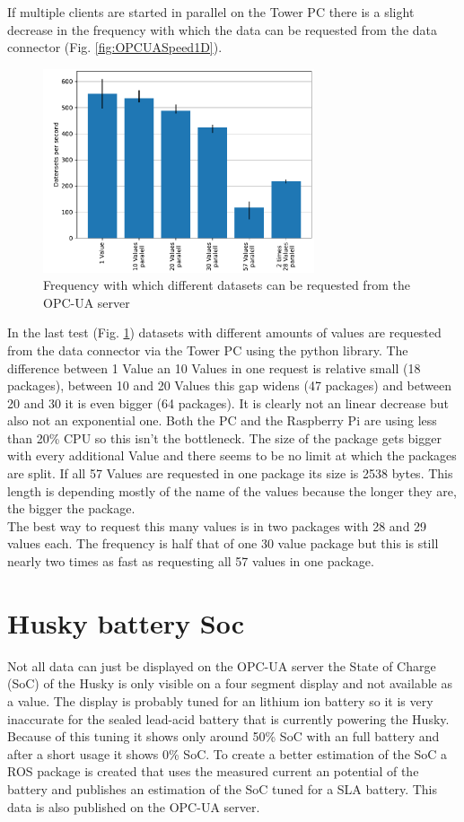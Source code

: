 \documentclass[conference]{IEEEtran}
\begin{document}
If multiple clients are started in parallel on the Tower PC there is a slight decrease in the frequency with which the data can be requested from the data connector (Fig. \ref{fig:OPCUASpeed1D}).\\
\begin{figure}[htbp]
    \centerline{\includegraphics[width=8cm]{Pictures/OPCUAMultipleDatenAufEinmal.pdf}}
    \caption{Frequency with which different datasets can be requested from the OPC-UA server}
    \label{fig:OPCUAMultipleDatenAufEinmal}
\end{figure}
In the last test (Fig. \ref{fig:OPCUAMultipleDatenAufEinmal}) datasets with different amounts of values are requested from the data connector via the Tower PC using the python library.
The difference between 1 Value an 10 Values in one request is relative small (18 packages), between 10 and 20 Values this gap widens (47 packages) and between 20 and 30 it is even bigger (64 packages).
It is clearly not an linear decrease but also not an exponential one. 
Both the PC and the Raspberry Pi are using less than 20\% CPU so this isn't the bottleneck.
The size of the package gets bigger with every additional Value and there seems to be no limit at which the packages are split.
If all 57 Values are requested in one package its size is 2538 bytes.
This length is depending mostly of the name of the values because the longer they are, the bigger the package.\\
The best way to request this many values is in two packages with 28 and 29 values each.
The frequency is half that of one 30 value package but this is still nearly two times as fast as requesting all 57 values in one package.
\section{Husky battery Soc}
Not all data can just be displayed on the OPC-UA server the State of Charge (SoC) of the Husky is only visible on a four segment display and not available as a value.
The display is probably tuned for an lithium ion battery so it is very inaccurate for the sealed lead-acid battery that is currently powering the Husky.
Because of this tuning it shows only around 50\% SoC with an full battery and after a short usage it shows 0\% SoC.
To create a better estimation of the SoC a ROS package is created that uses the measured current an potential of the battery and publishes an estimation of the SoC tuned for a SLA battery.
This data is also published on the OPC-UA server.
\end{document}
